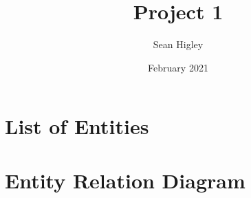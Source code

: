 \documentclass{article}
\title{Project 1}
\author{Sean Higley}
\date{February 2021}
\begin{document}
\maketitle

\section{List of Entities}
\section{Entity Relation Diagram}
\end{document}
